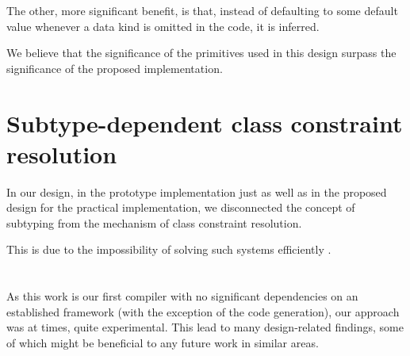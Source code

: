 The other, more significant benefit, is that, instead of defaulting to some default value whenever a data kind is omitted in the \cmm{} code, it is inferred.

We believe that the significance of the primitives used in this design surpass the significance of the proposed implementation. 

\section{Subtype-dependent class constraint resolution}

In our design, in the prototype implementation just as well as in the proposed design for the practical implementation, we disconnected the concept of subtyping from the mechanism of class constraint resolution.

This is due to the impossibility of solving such systems efficiently .


\section{}

As this work is our first compiler with no significant dependencies on an established framework (with the exception of the code generation), our approach was at times, quite experimental. This lead to many design-related findings, some of which might be beneficial to any future work in similar areas.

